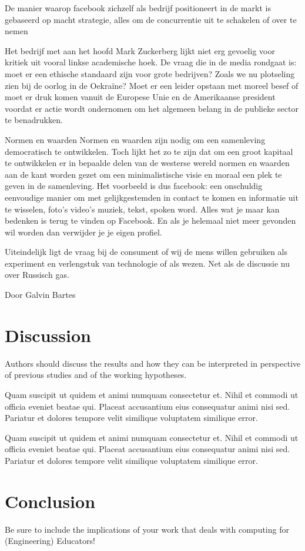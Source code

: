\documentclass[11pt]{report}
\begin{document}
De manier waarop facebook zichzelf als bedrijf positioneert in de markt is gebaseerd op macht strategie, alles om de concurrentie uit te schakelen of over te nemen

Het bedrijf met aan het hoofd Mark Zuckerberg lijkt niet erg gevoelig voor kritiek uit vooral linkse academische hoek. De vraag die in de media rondgaat is: moet er een ethische standaard zijn voor grote bedrijven? Zoals we nu plotseling zien bij de oorlog in de Oekraïne? Moet er een leider opstaan met moreel besef of moet er druk komen vanuit de Europese Unie en de Amerikaanse president voordat er actie wordt ondernomen om het algemeen belang in de publieke sector te benadrukken.

Normen en waarden
Normen en waarden zijn nodig om een samenleving democratisch te ontwikkelen.  Toch lijkt het zo te zijn dat om een groot kapitaal te ontwikkelen er in bepaalde delen van de westerse wereld normen en waarden aan de kant worden gezet om een minimalistische visie en moraal een plek te geven in de samenleving. Het voorbeeld is dus facebook: een onschuldig eenvoudige manier om met gelijkgestemden in contact te komen en informatie uit te wisselen, foto's video's muziek, tekst, spoken word. Alles wat je maar kan bedenken is terug te vinden op Facebook. En als je helemaal niet meer gevonden wil worden dan verwijder je je eigen profiel.

Uiteindelijk ligt de vraag bij de consument of wij de mens willen gebruiken als experiment en verlengstuk van technologie of als wezen. Net als de discussie nu over Russisch gas.


Door Galvin Bartes






\section{Discussion}

Authors should discuss the results and how they can be interpreted in perspective of previous studies and of the working hypotheses. 

 Quam suscipit ut quidem et animi numquam consectetur et. Nihil et commodi ut officia eveniet beatae qui. Placeat accusantium eius consequatur animi nisi sed. Pariatur et dolores tempore velit similique voluptatem similique error.

 Quam suscipit ut quidem et animi numquam consectetur et. Nihil et commodi ut officia eveniet beatae qui. Placeat accusantium eius consequatur animi nisi sed. Pariatur et dolores tempore velit similique voluptatem similique error.

\section{Conclusion}

Be sure to include the implications of your work that deals with computing for (Engineering) Educators!



\end{document}
